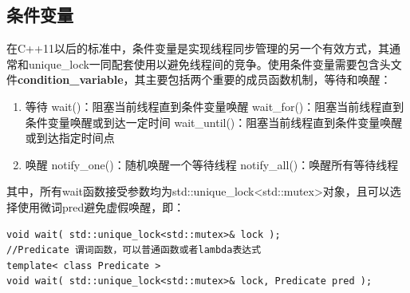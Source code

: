 \subsection{条件变量}
在C++11以后的标准中，条件变量是实现线程同步管理的另一个有效方式，其通常和unique\_lock一同配套使用以避免线程间的竞争。使用条件变量需要包含头文件\textbf{condition\_variable}，其主要包括两个重要的成员函数机制，等待和唤醒：\\
\begin{enumerate}
	\item 等待 
		\iitem wait()：阻塞当前线程直到条件变量唤醒
		\iitem wait\_for()：阻塞当前线程直到条件变量唤醒或到达一定时间
		\iitem wait\_until()：阻塞当前线程直到条件变量唤醒或到达指定时间点
	\item 唤醒
		\iitem notify\_one()：随机唤醒一个等待线程
		\iitem notify\_all()：唤醒所有等待线程
\end{enumerate}
其中，所有wait函数接受参数均为std::unique\_lock<std::mutex>对象，且可以选择使用微词pred避免虚假唤醒，即：\\
\begin{lstlisting}
void wait( std::unique_lock<std::mutex>& lock );
//Predicate 谓词函数，可以普通函数或者lambda表达式
template< class Predicate >
void wait( std::unique_lock<std::mutex>& lock, Predicate pred );
\end{lstlisting}